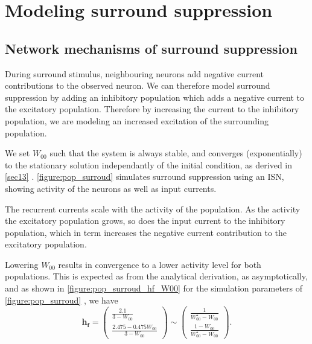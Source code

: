 \documentclass[10pt,conference,compsocconf,a4paper]{IEEEtran}
\renewcommand{\vec}[1]{\boldsymbol{#1}}
\newcommand*{\shortautoref}[1]{%
	\begingroup
	\def\equationautorefname{\textsc{Eq.}}%
	\def\tableautorefname{\textsc{Tab.}}%
	\def\figureautorefname{\textsc{Fig.}}%
	\autoref{#1}%
	\endgroup
}
\begin{document}
\section{Modeling surround suppression}
\label{sec2}

	\subsection{Network mechanisms of surround suppression}
	\label{sec21}

		During surround stimulus, neighbouring neurons add negative current contributions to the observed neuron. We can therefore model surround suppression by adding an inhibitory population which adds a negative current to the excitatory population. Therefore by increasing the current to the inhibitory population, we are modeling an increased excitation of the surrounding population.

		We set $W_{00}$ such that the system is always stable, and converges (exponentially) to the stationary solution independantly of the initial condition, as derived in \shortautoref{sec13}. \shortautoref{figure:pop_surroud} simulates surround suppression using an ISN, showing activity of the neurons as well as input currents.

		The recurrent currents scale with the activity of the population. As the activity the excitatory population grows, so does the input current to the inhibitory population, which in term increases the negative current contribution to the excitatory population.

		Lowering $W_{00}$ results in convergence to a lower activity level for both populations. This is expected as from the analytical derivation, as asymptotically, and as shown in \shortautoref{figure:pop_surroud_hf_W00} for the simulation parameters of \shortautoref{figure:pop_surroud}, we have
	\
		\begin{equation*}
			\vec{h_f} =
			\begin{pmatrix}
				\frac{2.1}{3-W_{00}}\\
				\frac{2.475 - 0.475W_{00}}{3-W_{00}}
			\end{pmatrix}
			\sim \begin{pmatrix}
				\frac{1}{W_{00}^\star - W_{00}} \\
				\frac{1 - W_{00}}{W_{00}^\star - W_{00}}
			\end{pmatrix}.
		\end{equation*}
\end{document}
